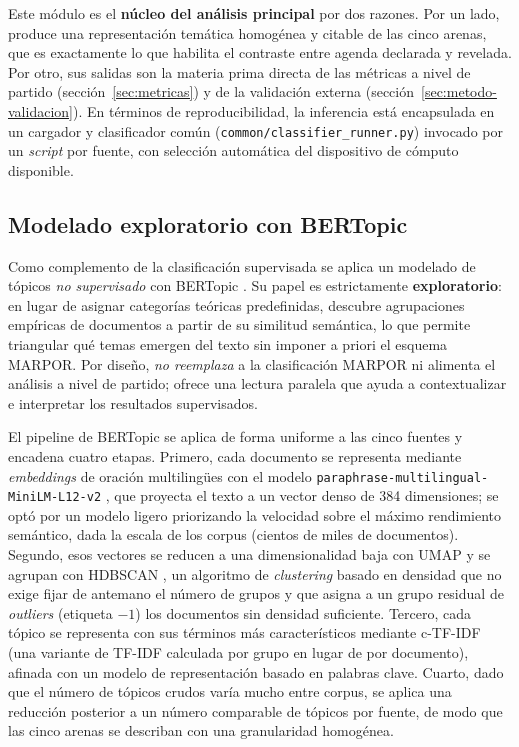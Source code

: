 Este módulo es el \textbf{núcleo del análisis principal} por dos razones. Por un
lado, produce una representación temática homogénea y citable de las cinco
arenas, que es exactamente lo que habilita el contraste entre agenda declarada y
revelada. Por otro, sus salidas son la materia prima directa de las métricas a
nivel de partido (sección~\ref{sec:metricas}) y de la validación externa
(sección~\ref{sec:metodo-validacion}). En términos de reproducibilidad, la
inferencia está encapsulada en un cargador y clasificador común
(\texttt{common/classifier\_runner.py}) invocado por un \emph{script} por fuente,
con selección automática del dispositivo de cómputo disponible.

\subsection{Modelado exploratorio con BERTopic}
\label{sec:metodo-bertopic}

Como complemento de la clasificación supervisada se aplica un modelado de tópicos
\emph{no supervisado} con BERTopic \cite{grootendorst2022bertopic}. Su papel es
estrictamente \textbf{exploratorio}: en lugar de asignar categorías teóricas
predefinidas, descubre agrupaciones empíricas de documentos a partir de su
similitud semántica, lo que permite triangular qué temas emergen del texto sin
imponer a priori el esquema MARPOR. Por diseño, \emph{no reemplaza} a la
clasificación MARPOR ni alimenta el análisis a nivel de partido; ofrece una
lectura paralela que ayuda a contextualizar e interpretar los resultados
supervisados.

El pipeline de BERTopic se aplica de forma uniforme a las cinco fuentes y
encadena cuatro etapas. Primero, cada documento se representa mediante
\emph{embeddings} de oración multilingües con el modelo
\texttt{paraphrase-multilingual-MiniLM-L12-v2} \cite{reimers2019sentencebert},
que proyecta el texto a un vector denso de 384 dimensiones; se optó por un modelo
ligero priorizando la velocidad sobre el máximo rendimiento semántico, dada la
escala de los corpus (cientos de miles de documentos). Segundo, esos vectores se reducen a una dimensionalidad
baja con UMAP \cite{mcinnes2018umap} y se agrupan con HDBSCAN
\cite{mcinnes2017hdbscan}, un algoritmo de \emph{clustering} basado en densidad
que no exige fijar de antemano el número de grupos y que asigna a un grupo
residual de \emph{outliers} (etiqueta $-1$) los documentos sin densidad
suficiente. Tercero, cada tópico se representa con sus términos más
característicos mediante c-TF-IDF (una variante de TF-IDF calculada por grupo en
lugar de por documento), afinada con un modelo de representación basado en
palabras clave. Cuarto, dado que el número de tópicos crudos varía mucho entre
corpus, se aplica una reducción posterior a un número comparable de tópicos por
fuente, de modo que las cinco arenas se describan con una granularidad
homogénea.

